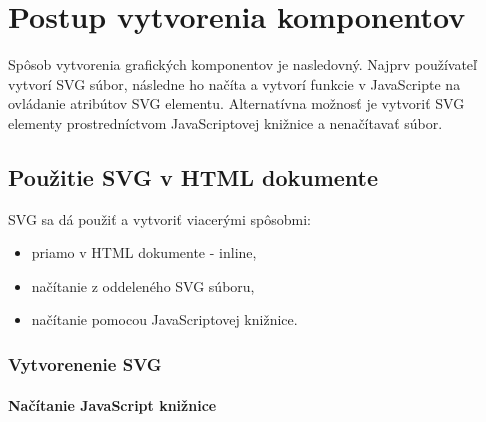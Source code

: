 \chapter{Postup vytvorenia komponentov}

Spôsob vytvorenia grafických komponentov je nasledovný. Najprv používateľ vytvorí SVG súbor, následne ho načíta a vytvorí funkcie v JavaScripte na ovládanie atribútov SVG elementu. 
Alternatívna možnosť je vytvoriť SVG elementy prostredníctvom JavaScriptovej knižnice a nenačítavať súbor. 



\section{Použitie SVG v HTML dokumente}

SVG sa dá použiť a vytvoriť viacerými spôsobmi:
\begin{itemize}
	\item priamo v HTML dokumente - inline, 
	\item načítanie z oddeleného SVG súboru,
	\item načítanie pomocou JavaScriptovej knižnice.
\end{itemize}


 \subsection{Vytvorenenie SVG }
 
 
 \subsubsection{Načítanie JavaScript knižnice}


